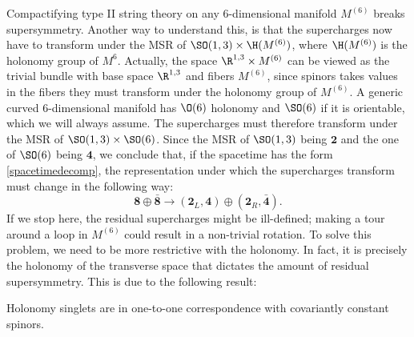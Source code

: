 \documentclass{worksheetclass}
\begin{document}
        Compactifying type II string theory on any $6$-dimensional manifold $M^{(6)}$ breaks supersymmetry.
        Another way to understand this, is that the supercharges now have to transform under the MSR of $\SO(1,3)\times\H(M^{(6)})$, where $\H(M^{(6)})$ is the holonomy group of $M^{6}$. Actually, the space $\R^{1,3}\times M^{(6)}$ can be viewed as the trivial bundle with base space $\R^{1,3}$ and fibers $M^{(6)}$, since spinors takes values in the fibers they must transform under the holonomy group of $M^{(6)}$. A generic curved $6$-dimensional manifold has $\O(6)$ holonomy and $\SO(6)$ if it is orientable, which we will always assume. The supercharges must therefore transform under the MSR of $\SO(1,3)\times\SO(6)$. Since the MSR of $\SO(1,3)$ being $\boldsymbol{2}$ and the one of $\SO(6)$ being $\boldsymbol{4}$, we conclude that, if the spacetime has the form \eqref{spacetimedecomp}, the representation under which the supercharges transform must change in the following way:
        \begin{equation}
            \boldsymbol{8}\oplus\bar{\boldsymbol{8}}\to (\boldsymbol{2}_L,\boldsymbol{4})\oplus(\boldsymbol{2}_R,\bar{\boldsymbol{4}}).
        \end{equation}
        If we stop here, the residual supercharges might be ill-defined; making a tour around a loop in $M^{(6)}$ could result in a non-trivial rotation. To solve this problem, we need to be more restrictive with the holonomy. In fact, it is precisely the holonomy of the transverse space that dictates the amount of residual supersymmetry. This is due to the following result:
        \begin{theorem*}
            Holonomy singlets are in one-to-one correspondence with covariantly constant spinors.
        \end{theorem*} 
\end{document}
